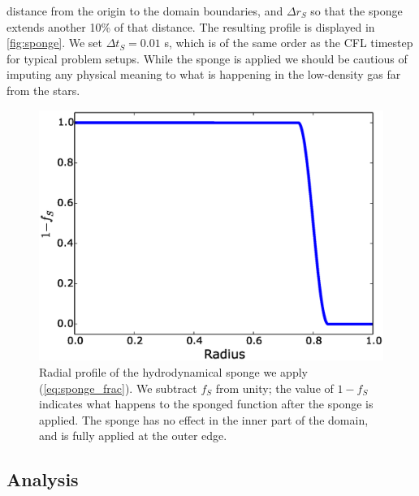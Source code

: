 \documentclass[iop]{../emulateapj}
\begin{document}
distance from the origin to the domain boundaries, and $\Delta r_S$ so
that the sponge extends another 10\% of that distance. The resulting profile 
is displayed in \autoref{fig:sponge}. We set $\Delta
t_S = 0.01$ s, which is of the same order as the CFL timestep
for typical problem setups. While the sponge is applied we should be cautious of imputing any physical 
meaning to what is happening in the low-density gas far from the stars.
\begin{figure}
  \centering
  \includegraphics[scale=0.4]{plots/sponge}
  \caption{Radial profile of the hydrodynamical sponge we apply (\autoref{eq:sponge_frac}). 
           We subtract $f_S$ from unity; the value of $1 - f_S$ indicates what happens 
           to the sponged function after the sponge is applied. The sponge has no effect 
           in the inner part of the domain, and is fully applied at the outer edge.\label{fig:sponge}}
\end{figure}

\subsection{Analysis}
\label{sec:analysis}
\end{document}
